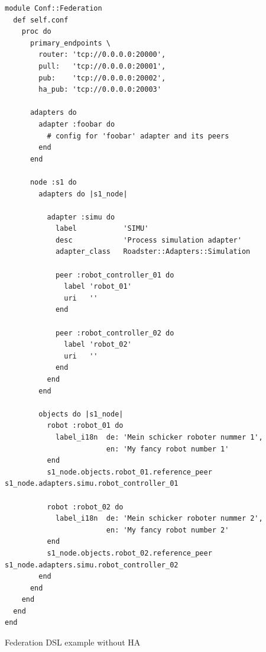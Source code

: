 \begin{listing}
	\begin{verbatim}
module Conf::Federation
  def self.conf
    proc do
      primary_endpoints \
        router: 'tcp://0.0.0.0:20000',
        pull:   'tcp://0.0.0.0:20001',
        pub:    'tcp://0.0.0.0:20002',
        ha_pub: 'tcp://0.0.0.0:20003'

      adapters do
        adapter :foobar do
          # config for 'foobar' adapter and its peers
        end
      end

      node :s1 do
        adapters do |s1_node|

          adapter :simu do
            label           'SIMU'
            desc            'Process simulation adapter'
            adapter_class   Roadster::Adapters::Simulation

            peer :robot_controller_01 do
              label 'robot_01'
              uri   ''
            end

            peer :robot_controller_02 do
              label 'robot_02'
              uri   ''
            end
          end
        end

        objects do |s1_node|
          robot :robot_01 do
            label_i18n  de: 'Mein schicker roboter nummer 1',
                        en: 'My fancy robot number 1'
          end
          s1_node.objects.robot_01.reference_peer s1_node.adapters.simu.robot_controller_01

          robot :robot_02 do
            label_i18n  de: 'Mein schicker roboter nummer 2',
                        en: 'My fancy robot number 2'
          end
          s1_node.objects.robot_02.reference_peer s1_node.adapters.simu.robot_controller_02
        end
      end
    end
  end
end
	\end{verbatim}
	\caption{Federation DSL example without HA}
	\label{lst:dsl:topo:no-ha}
\end{listing}

